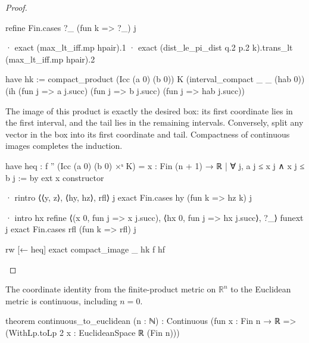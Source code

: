\begin{proof}
\begin{lean}
        refine Fin.cases ?_ (fun k => ?_) j

        · exact (max_lt_iff.mp hpair).1
        · exact (dist_le_pi_dist q.2 p.2 k).trans_lt (max_lt_iff.mp hpair).2

      have hk := compact_product (Icc (a 0) (b 0)) K (interval_compact _ _ (hab 0))
        (ih (fun j => a j.succ) (fun j => b j.succ) (fun j => hab j.succ))
  \end{lean}

  The image of this product is exactly the desired box: its first coordinate lies in the first
  interval, and the tail lies in the remaining intervals.
  Conversely, split any vector in the box into its first coordinate and tail.
  Compactness of continuous images completes the induction.

  \begin{lean}
    have heq : f '' (Icc (a 0) (b 0) ×ˢ K) =
        {x : Fin (n + 1) → ℝ | ∀ j, a j ≤ x j ∧ x j ≤ b j} := by
      ext x
      constructor

      · rintro ⟨⟨y, z⟩, ⟨hy, hz⟩, rfl⟩ j
        exact Fin.cases hy (fun k => hz k) j

      · intro hx
        refine ⟨(x 0, fun j => x j.succ), ⟨hx 0, fun j => hx j.succ⟩, ?_⟩
        funext j
        exact Fin.cases rfl (fun k => rfl) j

    rw [← heq]
    exact compact_image _ hk f hf
  \end{lean}

\end{proof}

\begin{lemma}
  \label{ma:lem:continuous-to-euclidean}
  The coordinate identity from the finite-product metric on $\mathbb R^n$ to the Euclidean metric
  is continuous, including $n=0$.

  \begin{lean}
    theorem continuous_to_euclidean (n : ℕ) :
        Continuous (fun x : Fin n → ℝ => (WithLp.toLp 2 x : EuclideanSpace ℝ (Fin n)))
  \end{lean}
\end{lemma}

